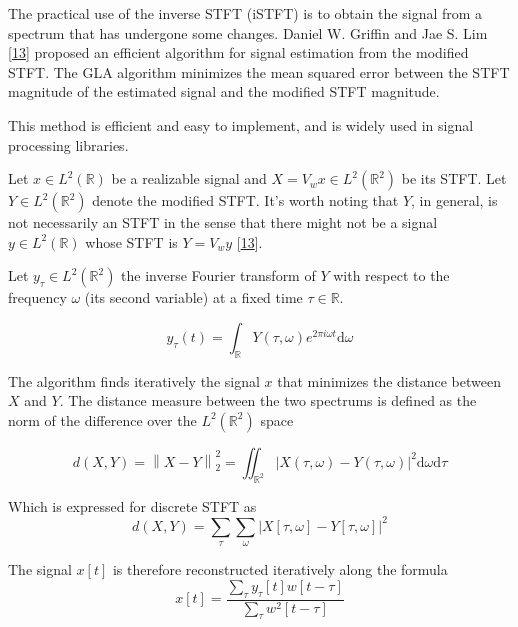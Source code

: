 \documentclass[american,]{article}
\theoremstyle{definition}
\theoremstyle{definition}
\theoremstyle{definition}
\theoremstyle{remark}
\begin{document}
The practical use of the inverse STFT (iSTFT) is to obtain the signal
from a spectrum that has undergone some changes.
Daniel W. Griffin and Jae S. Lim {[}\protect\hyperlink{ref-griffin1983}{13}{]} proposed
an efficient algorithm for signal estimation from the modified STFT.
The GLA algorithm minimizes the mean squared error between the STFT magnitude
of the estimated signal and the modified STFT magnitude.

This method is efficient and easy to implement, and is widely
used in signal processing libraries.

Let \(x\in L^2(\mathbb{R})\) be a realizable signal and \(X=V_w x\in L^2(\mathbb{R}^2)\)
be its STFT. Let \(Y\in L^2(\mathbb{R}^2)\) denote the modified STFT.
It's worth noting that \(Y\), in general, is not necessarily an STFT
in the sense that there might not be a signal \(y\in L^2(\mathbb{R})\)
whose STFT is \(Y=V_w y\) {[}\protect\hyperlink{ref-griffin1983}{13}{]}.

Let \(y_\tau \in L^2(\mathbb{R}^2)\) the inverse Fourier transform of \(Y\)
with respect to the frequency \(\omega\) (its second variable)
at a fixed time \(\tau\in\mathbb{R}\).

\begin{equation}
y_\tau(t) = \int_{\mathbb{R}} Y(\tau,\omega) e^{2\pi i\omega t} \mathrm{d}\omega
\end{equation}

The algorithm finds iteratively the signal \(x\) that minimizes
the distance between \(X\) and \(Y\). The distance measure between
the two spectrums is defined as the norm of the difference
over the \(L^2(\mathbb{R}^2)\) space

\begin{equation}
d(X,Y) = \left\lVert X-Y\right\rVert_2^2
    = \iint_{\mathbb{R}^2} \left\lvert X(\tau,\omega) - Y(\tau,\omega)\right\rvert^2 \mathrm{d}\omega\mathrm{d}\tau
\end{equation}

Which is expressed for discrete STFT as
\begin{equation}
d(X,Y) = \sum_\tau \sum_\omega\left\lvert X[\tau,\omega] - Y[\tau,\omega]\right\rvert^2
\end{equation}

The signal \(x[t]\) is therefore reconstructed iteratively along the formula
\begin{equation}
x[t] = \frac{\sum\limits_\tau y_\tau[t]w[t-\tau]}{\sum\limits_\tau w^2[t-\tau]}
\end{equation}
\end{document}
